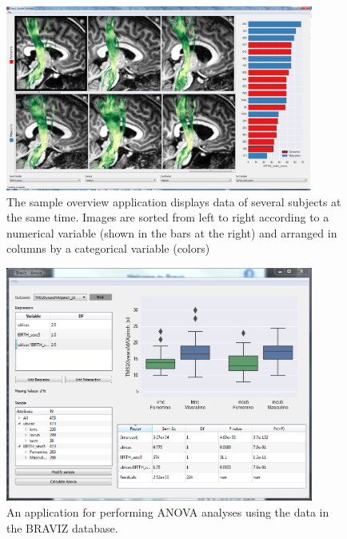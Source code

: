 \documentclass[twocolumn]{svjour3}
\begin{document}
\begin{figure}
\begin{center}
\includegraphics[width=0.9\textwidth]{figures/sample_overview.PNG}
\end{center}
 \caption{\label{fig_sample} The sample overview application displays data of several subjects at the same time. Images are sorted from left to right according to a numerical variable (shown in the bars at the right) and arranged in columns by a categorical variable (colors)  }
\end{figure}

\begin{figure}
\begin{center}
\includegraphics[width=0.9\textwidth]{figures/anova.PNG}
\end{center}
 \caption{\label{fig_anova}An application for performing ANOVA analyses using the data in the BRAVIZ database.}
\end{figure}
\end{document}
